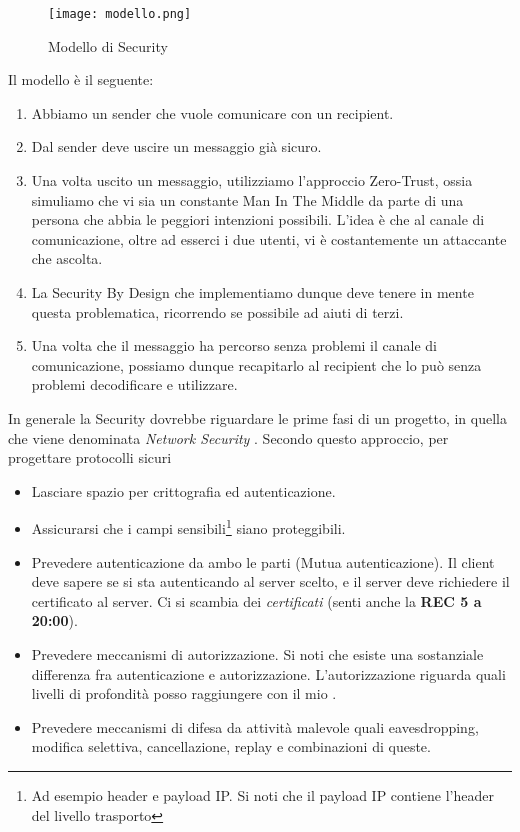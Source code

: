 \documentclass[14pt]{extreport}
\begin{document}
\begin{figure}[H]
    \centering
    \texttt{[image: modello.png]}
    \caption{Modello di Security}
    \label{ModelSec}
\end{figure}

Il modello è il seguente:

\begin{enumerate}
    \item Abbiamo un sender che vuole comunicare con un recipient.
    \item Dal sender deve uscire un messaggio già sicuro.
    \item Una volta uscito un messaggio, utilizziamo l'approccio Zero-Trust, ossia simuliamo che vi sia un constante Man In The Middle da parte di una persona che abbia le peggiori intenzioni possibili. L'idea è che al canale di comunicazione, oltre ad esserci i due utenti, vi è costantemente un attaccante che ascolta.
    \item La Security By Design che implementiamo dunque deve tenere in mente questa problematica, ricorrendo se possibile ad aiuti di terzi.
    \item Una volta che il messaggio ha percorso senza problemi il canale di comunicazione, possiamo dunque recapitarlo al recipient che lo può senza problemi decodificare e utilizzare.
\end{enumerate}



In generale la Security dovrebbe riguardare le prime fasi di un progetto, in quella che viene denominata \textit{Network Security }. Secondo questo approccio, per progettare protocolli sicuri


\begin{itemize}
    \item Lasciare spazio per crittografia ed autenticazione.
    \item Assicurarsi che i campi sensibili\footnote{Ad esempio header e payload IP. Si noti che il payload IP contiene l'header del livello trasporto} siano proteggibili.
    \item Prevedere autenticazione da ambo le parti (Mutua autenticazione). Il client deve sapere se si sta autenticando al server scelto, e il server deve richiedere il certificato al server. Ci si scambia dei \textit{certificati} (senti anche la \textbf{REC 5 a 20:00}).
    \item Prevedere meccanismi di autorizzazione. Si noti che esiste una sostanziale differenza fra autenticazione e autorizzazione. L'autorizzazione riguarda quali livelli di profondità posso raggiungere con il mio .
    \item Prevedere meccanismi di difesa da attività malevole quali eavesdropping, modifica selettiva, cancellazione, replay e combinazioni di queste.
\end{itemize}
\end{document}
